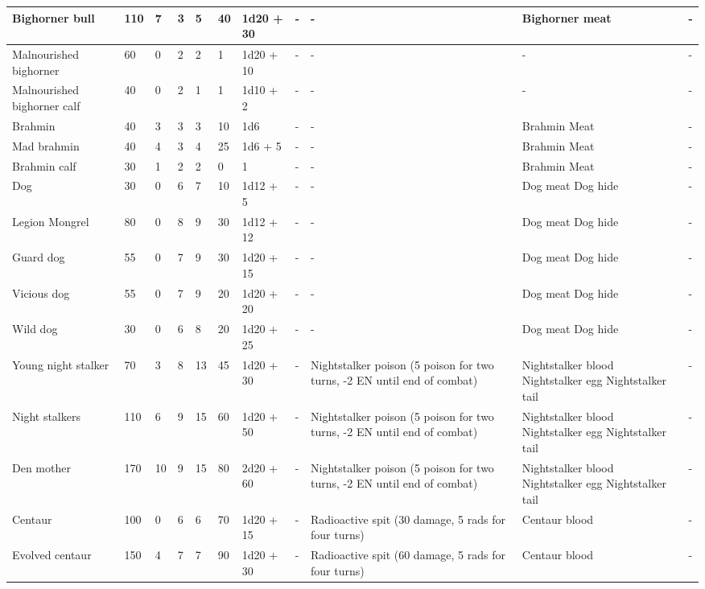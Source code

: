 \begin{longtable}{|p{2.5cm}|p{0.6cm}|p{0.6cm}|p{0.6cm}|p{0.6cm}|p{0.6cm}|p{1.5cm}|p{4cm}|p{4cm}|p{4cm}|p{2.3cm}|}
\hline
Bighorner bull & 110 & 7 & 3 & 5 & 40 & 1d20 + 30 & - & - & Bighorner meat & - \\
\hline
Malnourished bighorner & 60 & 0 & 2 & 2 & 1 & 1d20 + 10 & - & - & - & - \\
\hline
Malnourished bighorner calf & 40 & 0 & 2 & 1 & 1 & 1d10 + 2 & - & - & - & - \\
\hline
Brahmin & 40 & 3 & 3 & 3 & 10 & 1d6 & - & - & Brahmin Meat & - \\
\hline
Mad brahmin & 40 & 4 & 3 & 4 & 25 & 1d6 + 5 & - & - & Brahmin Meat & - \\
\hline
Brahmin calf & 30 & 1 & 2 & 2 & 0 & 1 & - & - & Brahmin Meat & - \\
\hline
Dog & 30 & 0 & 6 & 7 & 10 & 1d12 + 5  & - & - & Dog meat Dog hide & - \\
\hline
Legion Mongrel & 80 & 0 & 8 & 9 & 30 & 1d12 + 12 & - & - & Dog meat Dog hide & - \\
\hline
Guard dog & 55 & 0 & 7 & 9 & 30 & 1d20 + 15 & - & - & Dog meat Dog hide & - \\
\hline
Vicious dog & 55 & 0 & 7 & 9 & 20 & 1d20 + 20 & - & - & Dog meat Dog hide & - \\
\hline
Wild dog & 30 & 0 & 6 & 8 & 20 & 1d20 + 25 & - & - & Dog meat Dog hide & - \\
\hline
Young night stalker & 70 & 3 & 8 & 13 & 45 & 1d20 + 30 & - & Nightstalker poison (5 poison for two turns, -2 EN until end of combat) & Nightstalker blood \newline Nightstalker egg \newline Nightstalker tail & - \\
\hline
Night stalkers & 110 & 6 & 9 & 15 & 60 & 1d20 + 50 & - & Nightstalker poison (5 poison for two turns, -2 EN until end of combat) & Nightstalker blood \newline Nightstalker egg \newline Nightstalker tail & - \\
\hline
Den mother & 170 & 10 & 9 & 15 & 80 & 2d20 + 60 & - & Nightstalker poison (5 poison for two turns, -2 EN until end of combat) & Nightstalker blood \newline Nightstalker egg \newline Nightstalker tail & - \\
\hline
Centaur & 100 & 0 & 6 & 6 & 70 & 1d20 + 15 & - & Radioactive spit (30 damage, 5 rads for four turns) & Centaur blood & - \\
\hline
Evolved centaur & 150 & 4 & 7 & 7 & 90 & 1d20 + 30 & - & Radioactive spit (60 damage, 5 rads for four turns) & Centaur blood & - \\

\end{longtable}
